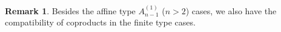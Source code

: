 \documentclass[10pt]{amsart}
\theoremstyle{definition}
\newtheorem{Remark}[Theorem]{Remark}
\numberwithin{equation}{section}
\newcommand{\sW}{\mathsf{W}}
\begin{document}
\begin{Remark}
Besides the affine type $A^{(1)}_{n-1}$ ($n>2$) cases, we also have the compatibility of coproducts in the finite type cases.

\end{Remark}
\end{document}

